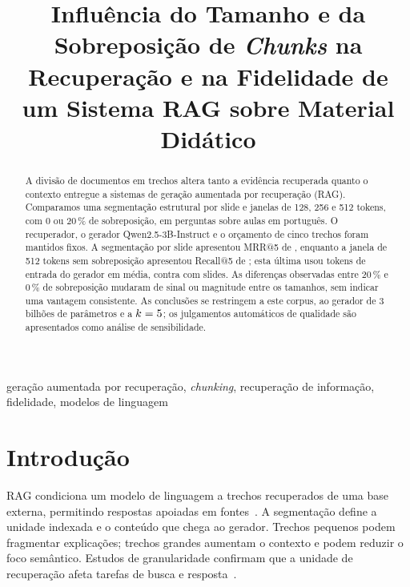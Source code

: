 \documentclass[conference]{IEEEtran}
\begin{document}
\title{Influência do Tamanho e da Sobreposição de \textit{Chunks} na Recuperação e na Fidelidade de um Sistema RAG sobre Material Didático}
\author{
\and
{}
}
\maketitle

\begin{abstract}
A divisão de documentos em trechos altera tanto a evidência recuperada quanto o contexto entregue a sistemas de geração aumentada por recuperação (RAG).
Comparamos uma segmentação estrutural por slide e janelas de 128, 256 e 512 tokens, com 0 ou 20\,\% de sobreposição, em \NPerguntasTeste{} perguntas sobre \NAulasCorpus{} aulas em português.
O recuperador, o gerador Qwen2.5-3B-Instruct e o orçamento de cinco trechos foram mantidos fixos.
A segmentação por slide apresentou MRR@5 de \MRRSlide{}, enquanto a janela de 512 tokens sem sobreposição apresentou Recall@5 de \RecallCincoCGrdSem{}; esta última usou \TokensEntradaCGrdSem{} tokens de entrada do gerador em média, contra \TokensEntradaSlide{} com slides.
As diferenças observadas entre 20\,\% e 0\,\% de sobreposição mudaram de sinal ou magnitude entre os tamanhos, sem indicar uma vantagem consistente.
As conclusões se restringem a este corpus, ao gerador de 3 bilhões de parâmetros e a $k=5$; os julgamentos automáticos de qualidade são apresentados como análise de sensibilidade.
\end{abstract}

\begin{IEEEkeywords}
geração aumentada por recuperação, \textit{chunking}, recuperação de informação, fidelidade, modelos de linguagem
\end{IEEEkeywords}

\section{Introdução}
RAG condiciona um modelo de linguagem a trechos recuperados de uma base externa, permitindo respostas apoiadas em fontes~\cite{lewis2020rag}.
A segmentação define a unidade indexada e o conteúdo que chega ao gerador.
Trechos pequenos podem fragmentar explicações; trechos grandes aumentam o contexto e podem reduzir o foco semântico.
Estudos de granularidade confirmam que a unidade de recuperação afeta tarefas de busca e resposta~\cite{chen2024dense}.
\end{document}
